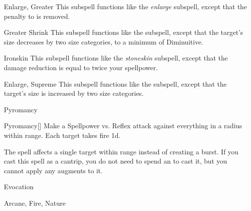 \begin{ability}[\nth{6}]{Enlarge, Greater}
This subspell functions like the \textit{enlarge} subspell, except that the penalty to  is removed.
\end{ability}
\vspace{0.25em}


\begin{ability}[\nth{6}]{Greater Shrink}
This subspell functions like the  subspell, except that the target's size decreases by two size categories, to a minimum of Diminuitive.
\end{ability}
\vspace{0.25em}


\begin{ability}[\nth{7}]{Ironskin}
This subspell functions like the \textit{stoneskin} subspell, except that the damage reduction is equal to twice your spellpower.
\end{ability}
\vspace{0.25em}


\begin{ability}[\nth{9}]{Enlarge, Supreme}
This subspell functions like the  subspell, except that the target's size is increased by two size categories.
\end{ability}
\vspace{0.25em}

\newpage
\begin{spellsection}{Pyromancy}

\begin{spellheader}
\end{spellheader}


\begin{ability}{Pyromancy}[]
Make a Spellpower vs. Reflex attack against everything in a \areasmall radius within \rngclose range.
\hit Each target takes fire  \minus1d.
\end{ability}



 The spell affects a single target within range instead of creating a burst. If you cast this spell as a cantrip,
you do not need to spend an  to cast it,
but you cannot apply any augments to it.


 Evocation

 Arcane, Fire, Nature
\end{spellsection}


